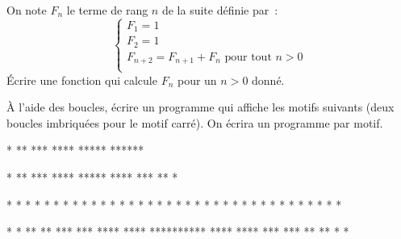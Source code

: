 \begin{exercice}
On note $F_n$ le terme de rang $n$ de la suite définie par~:
\[
\begin{cases}
F_1 = 1\\
F_2 = 1 \\
F_{n+2} = F_{n+1} + F_n \text{ pour tout } n>0\\
\end{cases}
\]
Écrire une fonction qui calcule $F_n$ pour un $n>0$ donné.
\end{exercice}

\begin{exercice}
À l'aide des boucles, écrire un programme qui affiche les motifs suivants (deux boucles imbriquées
pour le motif carré). On écrira un programme par motif.

\begin{multicols}{2}
\begin{result}
*
**
***
****
*****
******
\end{result}

\begin{result}
*
**
***
****
*****
****
***
**
*
\end{result}

\begin{result}
* * * * * *
* * * * * *
* * * * * *
* * * * * *
* * * * * *
* * * * * *
\end{result}

\begin{result}
*        *
**      **
***    ***
****  ****
**********
****  ****
***    ***
**      **
*        *
\end{result}
\end{multicols}
\end{exercice}
